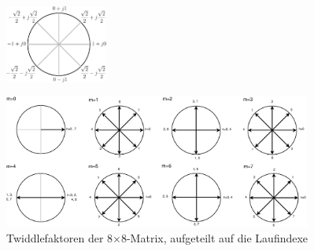  \begin{figure}[!t]
  \centering
  \includegraphics[width=0.3\textwidth]{img/Einheitskreis-crop.pdf}
  \label{pic:Einheitskreis_Faktoren}
\end{figure}
  
 


\begin{figure}[!ht]
 \centering
 \includegraphics[width=0.9\textwidth]{img/Twiddlefaktoren_Einheitskreis.eps}
 \caption{Twiddlefaktoren der 8$\times$8-Matrix, aufgeteilt auf die Laufindexe}
 \label{pic:Twiddlefaktoren_Darstellung8x8}
\end{figure}

\vspace{0.5cm}


 

